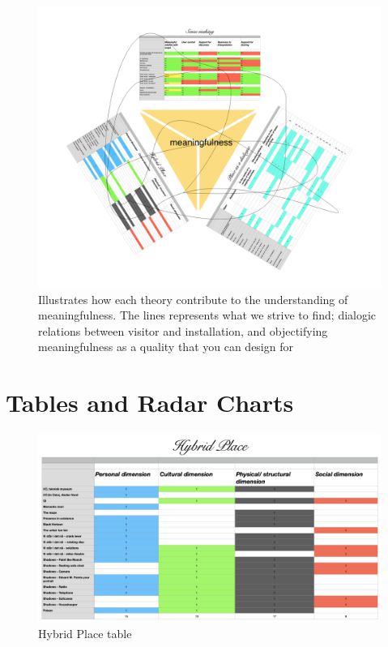 \begin{figure}[H]
\includegraphics[width=14cm]{pictures/analysis/table_triangle.png}
\caption{Illustrates how each theory contribute to the understanding of meaningfulness. The lines represents what we strive to find; dialogic relations between visitor and installation, and objectifying meaningfulness as a quality that you can design for}
\end{figure}

\section{Tables and Radar Charts}

\begin{figure}[H]
\includegraphics[width=20cm, angle=90]{pictures/analysis/hybrid.png}
\caption{Hybrid Place table}
\centering 
\end{figure}


